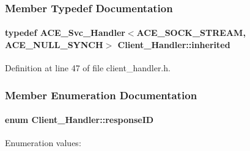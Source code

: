 \subsubsection{Member Typedef Documentation}
\hypertarget{classClient__Handler_Client__Handlers0}{
\paragraph[inherited]{\setlength{\rightskip}{0pt plus 5cm}typedef ACE\_\-Svc\_\-Handler$<$ACE\_\-SOCK\_\-STREAM, ACE\_\-NULL\_\-SYNCH$>$ Client\_\-Handler::inherited}\hfill}
\label{classClient__Handler_Client__Handlers0}




Definition at line 47 of file client\_\-handler.h.

\subsubsection{Member Enumeration Documentation}
\hypertarget{classClient__Handler_Client__Handleru2}{
\paragraph[responseID]{\setlength{\rightskip}{0pt plus 5cm}enum Client\_\-Handler::response\-ID}\hfill}
\label{classClient__Handler_Client__Handleru2}


\begin{Desc}
\item[Enumeration values: ]\par
\begin{description}
\item[{\em 
\hypertarget{classClient__Handler_Client__Handleru2Client__Handleru0}{
{\em ID\_\-CRC\_\-OK}}
\label{classClient__Handler_Client__Handleru2Client__Handleru0}
}]\item[{\em 
\hypertarget{classClient__Handler_Client__Handleru2Client__Handleru1}{
{\em ID\_\-CRC\_\-ERROR}}
\label{classClient__Handler_Client__Handleru2Client__Handleru1}
}]\end{description}
\end{Desc}



